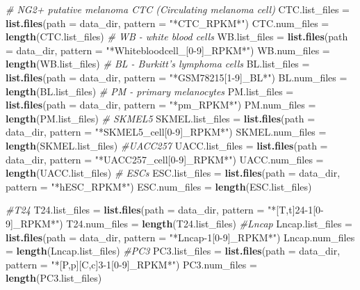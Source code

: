 \documentclass[]{article}
\newenvironment{Shaded}{\begin{snugshade}}{\end{snugshade}}
\newcommand{\KeywordTok}[1]{\textcolor[rgb]{0.13,0.29,0.53}{\textbf{#1}}}
\newcommand{\DataTypeTok}[1]{\textcolor[rgb]{0.13,0.29,0.53}{#1}}
\newcommand{\StringTok}[1]{\textcolor[rgb]{0.31,0.60,0.02}{#1}}
\newcommand{\CommentTok}[1]{\textcolor[rgb]{0.56,0.35,0.01}{\textit{#1}}}
\newcommand{\NormalTok}[1]{#1}
\begin{document}
\begin{Shaded}
\begin{Highlighting}[]
\CommentTok{# NG2+ putative melanoma CTC (Circulating melanoma cell)}
\NormalTok{CTC.list_files =}\StringTok{ }\KeywordTok{list.files}\NormalTok{(}\DataTypeTok{path =}\NormalTok{ data_dir, }\DataTypeTok{pattern =} \StringTok{"*CTC_RPKM*"}\NormalTok{)}
\NormalTok{CTC.num_files =}\StringTok{ }\KeywordTok{length}\NormalTok{(CTC.list_files)}
\CommentTok{# WB - white blood cells}
\NormalTok{WB.list_files =}\StringTok{ }\KeywordTok{list.files}\NormalTok{(}\DataTypeTok{path =}\NormalTok{ data_dir, }\DataTypeTok{pattern =} \StringTok{"*Whitebloodcell_[0-9]_RPKM*"}\NormalTok{)}
\NormalTok{WB.num_files =}\StringTok{ }\KeywordTok{length}\NormalTok{(WB.list_files)}
\CommentTok{# BL - Burkitt's lymphoma cells}
\NormalTok{BL.list_files =}\StringTok{ }\KeywordTok{list.files}\NormalTok{(}\DataTypeTok{path =}\NormalTok{ data_dir, }\DataTypeTok{pattern =} \StringTok{"*GSM78215[1-9]_BL*"}\NormalTok{)}
\NormalTok{BL.num_files =}\StringTok{ }\KeywordTok{length}\NormalTok{(BL.list_files)}
\CommentTok{# PM - primary melanocytes}
\NormalTok{PM.list_files =}\StringTok{ }\KeywordTok{list.files}\NormalTok{(}\DataTypeTok{path =}\NormalTok{ data_dir, }\DataTypeTok{pattern =} \StringTok{"*pm_RPKM*"}\NormalTok{)}
\NormalTok{PM.num_files =}\StringTok{ }\KeywordTok{length}\NormalTok{(PM.list_files)}
\CommentTok{# SKMEL5}
\NormalTok{SKMEL.list_files =}\StringTok{ }\KeywordTok{list.files}\NormalTok{(}\DataTypeTok{path =}\NormalTok{ data_dir, }\DataTypeTok{pattern =} \StringTok{"*SKMEL5_cell[0-9]_RPKM*"}\NormalTok{)}
\NormalTok{SKMEL.num_files =}\StringTok{ }\KeywordTok{length}\NormalTok{(SKMEL.list_files)}
\CommentTok{#UACC257}
\NormalTok{UACC.list_files =}\StringTok{ }\KeywordTok{list.files}\NormalTok{(}\DataTypeTok{path =}\NormalTok{ data_dir, }\DataTypeTok{pattern =} \StringTok{"*UACC257_cell[0-9]_RPKM*"}\NormalTok{)}
\NormalTok{UACC.num_files =}\StringTok{ }\KeywordTok{length}\NormalTok{(UACC.list_files)}
\CommentTok{# ESCs}
\NormalTok{ESC.list_files =}\StringTok{ }\KeywordTok{list.files}\NormalTok{(}\DataTypeTok{path =}\NormalTok{ data_dir, }\DataTypeTok{pattern =} \StringTok{"*hESC_RPKM*"}\NormalTok{)}
\NormalTok{ESC.num_files =}\StringTok{ }\KeywordTok{length}\NormalTok{(ESC.list_files)}

\CommentTok{#T24}
\NormalTok{T24.list_files =}\StringTok{ }\KeywordTok{list.files}\NormalTok{(}\DataTypeTok{path =}\NormalTok{ data_dir, }\DataTypeTok{pattern =} \StringTok{"*[T,t]24-1[0-9]_RPKM*"}\NormalTok{)}
\NormalTok{T24.num_files =}\StringTok{ }\KeywordTok{length}\NormalTok{(T24.list_files)}
\CommentTok{#Lncap}
\NormalTok{Lncap.list_files =}\StringTok{ }\KeywordTok{list.files}\NormalTok{(}\DataTypeTok{path =}\NormalTok{ data_dir, }\DataTypeTok{pattern =} \StringTok{"*Lncap-1[0-9]_RPKM*"}\NormalTok{)}
\NormalTok{Lncap.num_files =}\StringTok{ }\KeywordTok{length}\NormalTok{(Lncap.list_files)}
\CommentTok{#PC3}
\NormalTok{PC3.list_files =}\StringTok{ }\KeywordTok{list.files}\NormalTok{(}\DataTypeTok{path =}\NormalTok{ data_dir, }\DataTypeTok{pattern =} \StringTok{"*[P,p][C,c]3-1[0-9]_RPKM*"}\NormalTok{)}
\NormalTok{PC3.num_files =}\StringTok{ }\KeywordTok{length}\NormalTok{(PC3.list_files)}


\end{Highlighting}
\end{Shaded}
\end{document}
